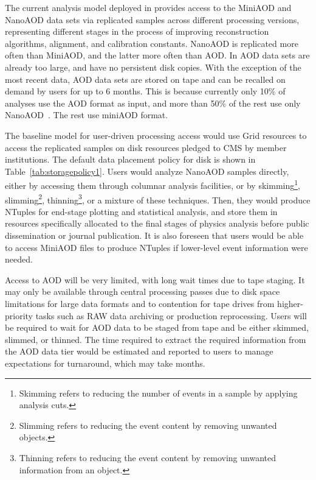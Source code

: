 The current analysis model deployed in \RunThree provides access to the MiniAOD and NanoAOD data sets via replicated samples across different processing versions, representing different stages in the process of improving reconstruction algorithms, alignment, and calibration constants. NanoAOD is replicated more often than MiniAOD, and the latter more often than \gls{AOD}. In \RunThree \gls{AOD} data sets are already too large, and have no persistent disk copies. With the exception of the most recent data, \gls{AOD} data sets are stored on tape and can be recalled on demand by users for up to 6 months.  
This is because currently only 10\% of analyses use the \gls{AOD} format as input, and more than 50\% of the rest use only NanoAOD~\cite{CMSOnCPublicTWikiNanoAODAdoption}. The rest use miniAOD format.

The \PhaseTwo baseline model for user-driven processing access would use Grid resources to access the replicated samples on disk resources pledged to CMS by member institutions. The default data placement policy for disk is shown in Table~\ref{tab:storagepolicy1}. Users would analyze NanoAOD samples directly, either by accessing them through columnar analysis facilities, or by skimming\footnote{Skimming refers to reducing the number of events in a sample by applying analysis cuts.}, slimming\footnote{Slimming refers to reducing the event content by removing unwanted objects.}, thinning\footnote{Thinning refers to reducing the event content by removing unwanted information from an object.}, or a mixture of these techniques. Then, they would produce NTuples for end-stage plotting and statistical analysis, and store them in resources specifically allocated to the final stages of physics analysis before public dissemination or journal publication. It is also foreseen that users would be able to access MiniAOD files to produce NTuples if lower-level event information were needed. 

Access to \gls{AOD} will be very limited, with long wait times due to tape staging. It may only be available through central processing passes due to disk space limitations for large data formats and to contention for tape drives from higher-priority tasks such as \gls{RAW} data archiving or production reprocessing. Users will be required to wait for \gls{AOD} data to be staged from tape and be either skimmed, slimmed, or thinned. The time required to extract the required information from the \gls{AOD} data tier would be estimated and reported to users to manage expectations for turnaround, which may take months.

